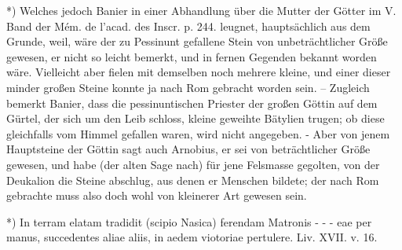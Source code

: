\documentclass[a4paper, 11pt, oneside, polutonikogreek, german]{article}
\begin{document}
*) Welches jedoch Banier in einer Abhandlung über die Mutter der Götter im V. Band der Mém. de l'acad. des Inscr. p. 244. leugnet, hauptsächlich aus dem Grunde, weil, wäre der zu Pessinunt gefallene Stein von unbeträchtlicher Größe gewesen, er nicht so leicht bemerkt, und in fernen Gegenden bekannt worden wäre. Vielleicht aber fielen mit demselben noch mehrere kleine, und einer dieser minder großen Steine konnte ja nach Rom gebracht worden sein. -- Zugleich bemerkt Banier, dass die pessinuntischen Priester der großen Göttin auf dem Gürtel, der sich um den Leib schloss, kleine geweihte Bätylien trugen; ob diese gleichfalls vom Himmel gefallen waren, wird nicht angegeben. - Aber von jenem Hauptsteine der Göttin sagt auch Arnobius, er sei von beträchtlicher Größe gewesen, und habe (der alten Sage nach) für jene Felsmasse gegolten, von der Deukalion die Steine abschlug, aus denen er Menschen bildete; der nach Rom gebrachte muss also doch wohl von kleinerer Art gewesen sein.

*) In terram elatam tradidit (scipio Nasica) ferendam Matronis - - - eae per manus, succedentes aliae aliis, in aedem viotoriae pertulere. Liv. XVII. v. 16.
\end{document}
